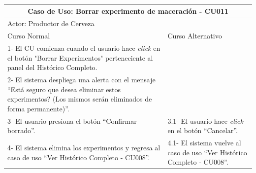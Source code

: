     
    \begin{minipage}{0.95\textwidth}
    \begin{center}
    \begin{tabularx}{\textwidth}{ | X | X |}
        \hline
        \multicolumn{2}{|c|}{\textbf{Caso de Uso: Borrar experimento de maceración - CU011}} \\
        \hline
        \multicolumn{2}{|l|}{Actor: Productor de Cerveza} \\
        \hline
        Curso Normal & Curso Alternativo \\
        \hline
        1- El CU comienza cuando el usuario hace \textit{click} en el botón "Borrar Experimentos" perteneciente al panel del Histórico Completo. & \\
        \hline
        2- El sistema despliega una alerta con el mensaje “Está seguro que desea eliminar estos experimentos? (Los mismos serán eliminados de forma permanente)”. &
        \\
        \hline
        3- El usuario presiona el botón “Confirmar borrado”. & 3.1- El usuario hace \textit{click} en el botón “Cancelar”.
        \\
        \hline
        4- El sistema elimina los experimentos y regresa al caso de uso “Ver Histórico Completo - CU008”. & 4.1- El sistema vuelve al caso de uso “Ver Histórico Completo - CU008”.
        \\
        \hline
    \end{tabularx}
    \label{CU011}
    \end{center}
    \end{minipage}
    
    